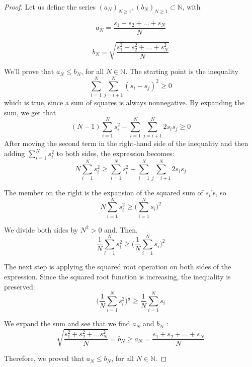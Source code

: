 \begin{proof}
    Let us define the series $(a_N)_{N \geq 1}, (b_N)_{N \geq 1} \subset \mathbb{N}$, with

    \vspace{1em}
    \begin{minipage}{0.5\textwidth}
        \[
            a_N = \frac{s_1 + s_2 + \ldots + s_N}{N}
        \]
    \end{minipage}
    \begin{minipage}{0.5\textwidth}
        \[
            b_N = \sqrt{\frac{s_1^2 + s_2^2 + \ldots + s_N^2}{N}} 
        \] 
    \end{minipage}
    \vspace{1em}

    We'll prove that $a_N \leq b_N$, for all $N \in \mathbb{N}$. The starting point is 
    the inequality
    \[
        \sum_{i = 1}^N \sum_{j = i + 1}^N (s_i - s_j)^2 \geq 0
    \] 
    which is true, since a sum of squares is always nonnegative. By expanding
    the sum, we get that
    \[
        (N - 1)\sum_{i = 1}^{N}s_i^2 - \sum_{i = 1}^N \sum_{j = i + 1}^N 2s_is_j \geq 0
    \] 
    After moving the second term in the right-hand side of the inequality and then
    adding $\displaystyle \sum_{i = 1}^{N} s_i^2$ to both sides, the expression becomes:
    \[
        N\sum_{i = 1}^N s_i^2 \geq \sum_{i = 1}^N s_i^2 + \sum_{i = 1}^N \sum_{j = i + 1}^N 2s_is_j
    \] 

    The member on the right is the expansion of the squared sum of $s_i$'s, so
    \[
        N\sum_{i = 1}^N s_i^2 \geq \bigg(\sum_{i = 1}^{N} s_i\bigg)^2
    \] 

    We divide both sides by $N^2 > 0$ and. Then,
    \[
        \frac{1}{N}\sum_{i = 1}^N s_i^2 \geq \bigg(\frac{1}{N}\sum_{i = 1}^{N} s_i\bigg)^2
    \] 

    The next step is applying the squared root operation on both sides of the expression.
    Since the squared root function is increasing, the inequality is preserved:
    \[
        \bigg(\frac{1}{N}\sum_{i = 1}^N s_i^2\bigg)^{\frac{1}{2}} \geq \frac{1}{N}\sum_{i = 1}^{N} s_i
    \] 

    We expand the sum and see that we find $a_N$ and $b_N$ :
    \[
        \sqrt{\frac{s_1^2 + s_2^2 + \ldots s_N^2}{N}} = b_N \geq a_N = \frac{s_1 + s_2 + \ldots + s_N}{N}
    \] 

    Therefore, we proved that $a_N \leq b_N$, for all $N \in \mathbb{N}$.

    \vspace{1em}


\end{proof}
